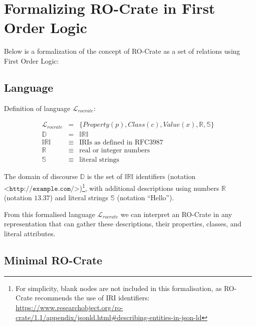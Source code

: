 %


\section{Formalizing RO-Crate in First Order Logic}

Below is a formalization of the concept of RO-Crate as a set of relations using First Order Logic:

\subsection{Language}

Definition of language $\mathcal{L}_{rocrate}$:

\begin{eqnarray*}
    \mathcal{L}_{rocrate}   & = & \big\{ Property(p), Class(c),
                            Value(x), \mathbb{R}, \mathbb{S} \big\} \\
    \mathbb{D}              & = & \mathbb{IRI} \\
    \mathbb{IRI}            & \equiv & { \text{IRIs as defined in RFC3987} } \\
    \mathbb{R}              & \equiv & { \text{real or integer numbers} } \\
    \mathbb{S}              & \equiv & { \text{literal strings} }
\end{eqnarray*}


The domain of discourse $\mathbb{D}$ is the set of $\mathbb{IRI}$ identifiers \cite{doi:10.17487/rfc3987} (notation $\texttt{<http://example.com/>}$)\footnote{
    For simplicity, blank nodes are not included in this formalisation, as RO-Crate
    recommends the use of IRI identifiers: \url{https://www.researchobject.org/ro-crate/1.1/appendix/jsonld.html#describing-entities-in-json-ld}
}, with additional descriptions using numbers $\mathbb{R}$ (notation $13.37$) and literal strings $\mathbb{S}$ (notation $\text{“Hello”}$).

From this formalised language $\mathcal{L}_{rocrate}$ we can interpret an RO-Crate in any representation that can gather these descriptions, their properties, classes, and literal attributes.

\subsection{Minimal RO-Crate}

